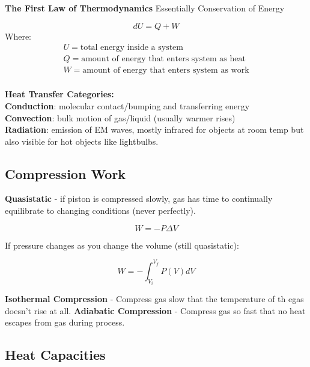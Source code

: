\begin{shaded}
\textbf{The First Law of Thermodynamics}\newline 
Essentially Conservation of Energy

\begin{equation}
dU = Q + W
\end{equation}
Where:
\begin{equation*}
\begin{split}
U = \text{total energy inside a system} \\
Q = \text{amount of energy that enters system as heat} \\
W = \text{amount of energy that enters system as work}\\
\end{split}
\end{equation*}
\end{shaded}


\textbf{Heat Transfer Categories:} \\
\textbf{Conduction}: molecular contact/bumping and transferring energy \\
\textbf{Convection}: bulk motion of gas/liquid (usually warmer rises) \\
\textbf{Radiation}: emission of EM waves, mostly infrared for objects at room temp but also visible for hot objects like lightbulbs.


\subsection{Compression Work}
\textbf{Quasistatic} - if piston is compressed slowly, gas has time to continually equilibrate to changing conditions (never perfectly).

\begin{equation}
W = -P \Delta V
\end{equation}

If pressure changes as you change the volume (still quasistatic):

\begin{equation}
    W = - \int_{V_i}^{V_f} P(V) dV
\end{equation}

\textbf{Isothermal Compression} - Compress gas slow that the temperature of th egas doesn't rise at all.
\textbf{Adiabatic Compression} - Compress gas so fast that no heat escapes from gas during process.

\subsection{Heat Capacities}

